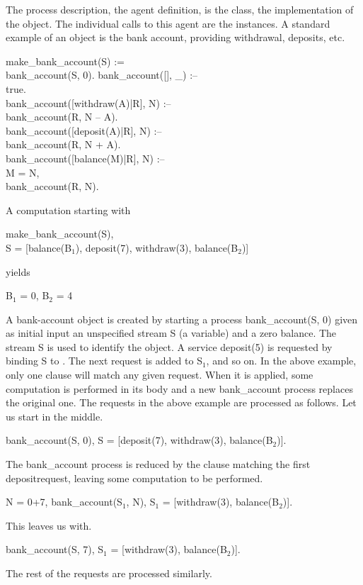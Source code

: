 The process description, the agent definition, is the class, the
implementation of the object.  The individual calls to this agent are
the instances.  A standard example of an object is the bank account,
providing withdrawal, deposits, etc.
%
\begin{program}
make_bank_account(S) := \\
\>\>	bank_account(S, 0).  \nl
bank_account([], _) :-- \\
\>\cond\>	true.  \\
bank_account([withdraw(A)|R], N) :-- \\
\>\cond\>	bank_account(R, N -- A).  \\
bank_account([deposit(A)|R], N) :-- \\
\>\cond\>	bank_account(R, N + A).  \\
bank_account([balance(M)|R], N) :-- \\
\>\cond\>	M = N, \\
\>\>	bank_account(R, N).
\end{program}%
%
A computation starting with
%
\begin{progex}
make_bank_account(S), \\
S = [balance(B$_1$), deposit(7), withdraw(3), balance(B$_2$)]
\end{progex}%
%
yields
%
\begin{progex}
B$_1$ = 0, B$_2$ = 4
\end{progex}%
%
A bank-account object is created by starting a process {\prog
bank_account(S, 0)} given as initial input an unspecified stream
{\prog S} (a variable) and a zero balance.  The stream {\prog S} is
used to identify the object.  A service {\prog deposit(5)} is
requested by binding {\prog S} to {\prog [deposit(5)|S$_1$]}.  The
next request is added to {\prog S$_1$}, and so on.  In the above
example, only one clause will match any given request.  When it is
applied, some computation is performed in its body and a new {\prog
bank_account} process replaces the original one.  The requests in the
above example are processed as follows.  Let us start in the middle.
%
\begin{progex}
bank_account(S, 0), S = [deposit(7), withdraw(3), balance(B$_2$)].
\end{progex}%
%
The {\prog bank_account} process is reduced by the clause matching the
first depositrequest, leaving some computation to be performed.
%
\begin{progex}
N = 0+7, bank_account(S$_1$, N), S$_1$ = [withdraw(3), balance(B$_2$)].
\end{progex}%
%
This leaves us with.
%
\begin{progex}
bank_account(S, 7), S$_1$ = [withdraw(3), balance(B$_2$)].
\end{progex}%
%
The rest of the requests are processed similarly.

